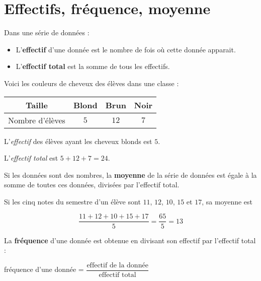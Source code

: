 \documentclass[../€Cours-complet/Cours-complet]{subfiles}
\begin{document}
\maketitleCours

\section{Effectifs, fréquence, moyenne}

\begin{cours}[Effectif]
	Dans une série de données :
	\begin{itemize}
		\item L'\textbf{effectif} d'une donnée est le nombre de fois où cette donnée apparait.
		\item L'\textbf{effectif total} est la somme de tous les effectifs.
	\end{itemize}
\end{cours}

\begin{exemple}
	Voici les couleurs de cheveux des élèves dans une classe :

	\begin{center}
		\begin{tabular}{|c|c|c|c|}
			\hline
			Taille          & Blond & Brun & Noir
			\\ \hline
			Nombre d'élèves & $5$   & $12$ & $7$
			\\ \hline
		\end{tabular}
	\end{center}

	L'\textit{effectif} des élèves ayant les cheveux blonds est $5$.

	L'\textit{effectif total} est $5 + 12 + 7 = 24$.
\end{exemple}

\begin{cours}[Moyenne]
	Si les données sont des nombres, la \textbf{moyenne} de la série de données est égale à la somme de toutes ces données, divisées par l'effectif total.
\end{cours}

\begin{exemple}
	Si les cinq notes du semestre d'un élève sont $11$, $12$, $10$, $15$ et $17$, sa moyenne est

	$$ \dfrac{11 + 12 + 10 + 15 + 17}{5} = \dfrac{65}{5} = 13 $$
\end{exemple}

\begin{cours}[Fréquence]
	La \textbf{fréquence} d'une donnée est obtenue en divisant son effectif par l'effectif total :
	\begin{center}
		fréquence d'une donnée = $\dfrac{\text{effectif de la donnée}}{\text{effectif total}}$
	\end{center}
\end{cours}
\end{document}
